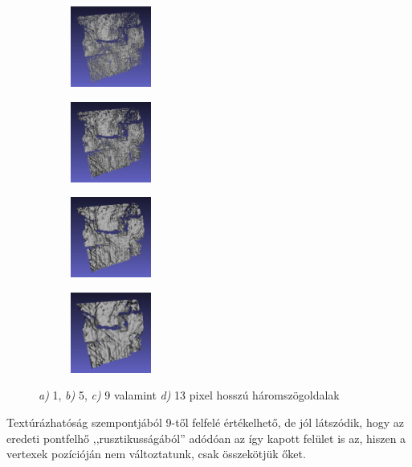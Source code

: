 \documentclass[a4paper,oneside]{article}
\begin{document}
\begin{figure}[tbh]
  \centering
  \begin{subfigure}[b]{.24\linewidth}
	\centering
	\includegraphics[width=75pt]{figs/fastmesh1.png}
	\caption{\label{fig:fastmesh1}}
  \end{subfigure}%
  \begin{subfigure}[b]{.24\linewidth}
	\centering
    \includegraphics[width=75pt]{figs/fastmesh5.png}
	\caption{\label{fig:fastmesh5}}
  \end{subfigure}
  \begin{subfigure}[b]{.24\linewidth}
	\centering
	\includegraphics[width=75pt]{figs/fastmesh9.png}
	\caption{\label{fig:fastmesh9}}
  \end{subfigure}%
  \begin{subfigure}[b]{.24\linewidth}
	\centering
    \includegraphics[width=75pt]{figs/fastmesh13.png}
	\caption{\label{fig:fastmesh13}}
  \end{subfigure}
\caption{\textit{a)} 1, \textit{b)} 5, \textit{c)} 9 valamint \textit{d)} 13 pixel hosszú háromszögoldalak \label{fig:fastmesh}}
\end{figure}

Textúrázhatóság szempontjából 9-től felfelé értékelhető, de jól látszódik, hogy az eredeti pontfelhő ,,rusztikusságából'' adódóan az így kapott felület is az, hiszen a vertexek pozícióján nem változtatunk, csak összekötjük őket.
\end{document}
